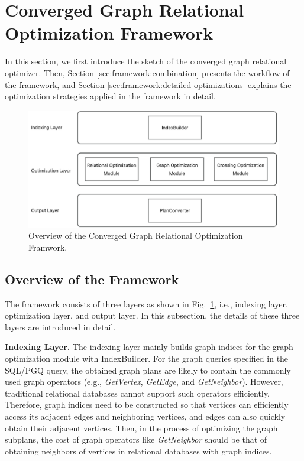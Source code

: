 \section{Converged Graph Relational Optimization Framework}

In this section, we first introduce the sketch of the converged graph relational optimizer.
Then, Section \ref{sec:framework:combination} presents the workflow of the framework, and Section \ref{sec:framework:detailed-optimizations} explains the optimization strategies applied in the framework in detail.

\begin{figure}
    \centering
    \includegraphics[width=\linewidth]{./figures/framework.png}
    \caption{Overview of the Converged Graph Relational Optimization Framwork.}
    \label{fig:framework-overview}
\end{figure}

\subsection{Overview of the Framework}

The framework consists of three layers as shown in Fig.~\ref{fig:framework-overview}, i.e., indexing layer, optimization layer, and output layer.
In this subsection, the details of these three layers are introduced in detail.

\textbf{Indexing Layer.} The indexing layer mainly builds graph indices for the graph optimization module with IndexBuilder.
For the graph queries specified in the SQL/PGQ query, the obtained graph plans are likely to contain the commonly used graph operators (e.g., \textit{GetVertex}, \textit{GetEdge}, and \textit{GetNeighbor}).
However, traditional relational databases cannot support such operators efficiently.
Therefore, graph indices need to be constructed so that vertices can efficiently access its adjacent edges and neighboring vertices, and edges can also quickly obtain their adjacent vertices.
Then, in the process of optimizing the graph subplans, the cost of graph operators like \textit{GetNeighbor} should be that of obtaining neighbors of vertices in relational databases with graph indices.

